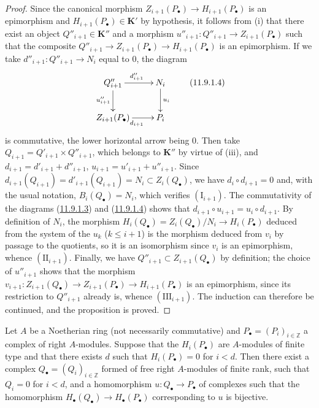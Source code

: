 \begin{proof}
Since the canonical morphism $Z_{i+1}(P_\bullet)\to H_{i+1}(P_\bullet)$ is
an epimorphism and $H_{i+1}(P_\bullet)\in\boldsymbol{K}'$ by hypothesis, it follows
from (i) that there exist an object $Q''_{i+1}\in\boldsymbol{K}''$ and a morphism
$u''_{i+1}:Q''_{i+1}\to Z_{i+1}(P_\bullet)$ such that the composite
$Q''_{i+1}\to Z_{i+1}(P_\bullet)\to H_{i+1}(P_\bullet)$ is an
epimorphism. If we take $d''_{i+1}:Q''_{i+1}\to N_i$ equal to $0$, the
diagram
\[
\xymatrix{
Q''_{i+1}\ar[r]^{d''_{i+1}}\ar[d]_{u''_{i+1}} &
N_i\ar[d]^{u_i}\\
Z_{i+1}(P_\bullet)\ar[r]_{d_{i+1}} & P_i
}
\tag{11.9.1.4}\label{0.11.9.1.4}
\]
is commutative, the lower horizontal arrow being $0$.
Then take $Q_{i+1}=Q'_{i+1}\times Q''_{i+1}$,
which belongs to $\boldsymbol{K}''$ by virtue of (iii), and
$d_{i+1}=d'_{i+1}+d''_{i+1}$, $u_{i+1}=u'_{i+1}+u''_{i+1}$.
Since $d_{i+1}(Q_{i+1})=d'_{i+1}(Q_{i+1})=N_i\subset Z_i(Q_\bullet)$, we have
$d_i\circ d_{i+1}=0$ and, with the usual notation,
$B_i(Q_\bullet)=N_i$, which verifies $(\mathrm I_{i+1})$. The commutativity
of the diagrams (\hyperref[0.11.9.1.3]{11.9.1.3}) and
(\hyperref[0.11.9.1.4]{11.9.1.4}) shows that
$d_{i+1}\circ u_{i+1}=u_i\circ d_{i+1}$. By definition of $N_i$, the
morphism $H_i(Q_\bullet)=Z_i(Q_\bullet)/N_i\to H_i(P_\bullet)$
deduced from the system of the $u_k$ ($k\leq i+1$) is the morphism deduced
from $v_i$ by passage to the quotients, so it is an isomorphism since $v_i$
is an epimorphism, whence $(\mathrm{II}_{i+1})$. Finally, we have
$Q''_{i+1}\subset Z_{i+1}(Q_\bullet)$ by definition; the choice of
$u''_{i+1}$ shows that the morphism $v_{i+1}:Z_{i+1}(Q_\bullet)\to Z_{i+1}(P_\bullet)
\to H_{i+1}(P_\bullet)$
is an epimorphism, since its restriction to $Q''_{i+1}$ already is, whence
$(\mathrm{III}_{i+1})$. The induction can therefore be continued, and the
proposition is proved.
\end{proof}

\begin{corollary}[11.9.2]
\label{0.11.9.2}
Let $A$ be a Noetherian ring (not necessarily commutative) and
$P_\bullet=(P_i)_{i\in\mathbb Z}$ a complex of right $A$-modules. Suppose
that the $H_i(P_\bullet)$ are $A$-modules of finite type and that there
exists $d$ such that $H_i(P_\bullet)=0$ for $i<d$. Then there exist a
complex $Q_\bullet=(Q_i)_{i\in\mathbb Z}$ formed of free right $A$-modules of
finite rank, such that $Q_i=0$ for $i<d$, and a homomorphism
$u:Q_\bullet\to P_\bullet$ of complexes such that the homomorphism
$H_\bullet(Q_\bullet)\to H_\bullet(P_\bullet)$ corresponding to $u$ is
bijective.
\end{corollary}

